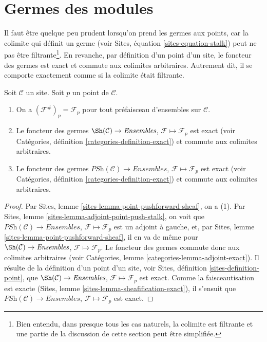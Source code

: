 \section{Germes des modules}
\label{section-stalks}

\noindent
Il faut être quelque peu prudent lorsqu'on prend les germes aux points, car la
colimite qui définit un germe (voir Sites, équation
\ref{sites-equation-stalk}) peut ne pas être filtrante\footnote{Bien entendu,
dans presque tous les cas naturels, la colimite est filtrante et une partie de
la discussion de cette section peut être simplifiée.}. En revanche, par
définition d'un point d'un site, le foncteur des germes est exact et commute aux
colimites arbitraires. Autrement dit, il se comporte exactement comme si la
colimite était filtrante.

\begin{lemma}
\label{lemma-stalk-exact}
Soit $\mathcal{C}$ un site.
Soit $p$ un point de $\mathcal{C}$.
\begin{enumerate}
\item On a $(\mathcal{F}^\#)_p = \mathcal{F}_p$
pour tout préfaisceau d'ensembles sur $\mathcal{C}$.
\item Le foncteur des germes
$\Sh(\mathcal{C}) \to \textit{Ensembles}$,
$\mathcal{F} \mapsto \mathcal{F}_p$ est exact (voir
Catégories, définition \ref{categories-definition-exact})
et commute aux colimites arbitraires.
\item Le foncteur des germes
$\textit{PSh}(\mathcal{C}) \to \textit{Ensembles}$,
$\mathcal{F} \mapsto \mathcal{F}_p$ est exact (voir
Catégories, définition \ref{categories-definition-exact})
et commute aux colimites arbitraires.
\end{enumerate}
\end{lemma}

\begin{proof}
Par Sites, lemme \ref{sites-lemma-point-pushforward-sheaf}, on a (1).
Par Sites, lemme \ref{sites-lemma-adjoint-point-push-stalk}, on voit que
$\textit{PSh}(\mathcal{C}) \to \textit{Ensembles}$,
$\mathcal{F} \mapsto \mathcal{F}_p$ est un adjoint à gauche, et, par
Sites, lemme \ref{sites-lemma-point-pushforward-sheaf}, il en va de même pour
$\Sh(\mathcal{C}) \to \textit{Ensembles}$,
$\mathcal{F} \mapsto \mathcal{F}_p$.
Le foncteur des germes commute donc aux colimites arbitraires (voir
Catégories, lemme \ref{categories-lemma-adjoint-exact}).
Il résulte de la définition d'un point d'un site, voir
Sites, définition \ref{sites-definition-point}, que
$\Sh(\mathcal{C}) \to \textit{Ensembles}$,
$\mathcal{F} \mapsto \mathcal{F}_p$
est exact. Comme la faisceautisation est exacte
(Sites, lemme \ref{sites-lemma-sheafification-exact}), il s'ensuit que
$\textit{PSh}(\mathcal{C}) \to \textit{Ensembles}$,
$\mathcal{F} \mapsto \mathcal{F}_p$
est exact.
\end{proof}

